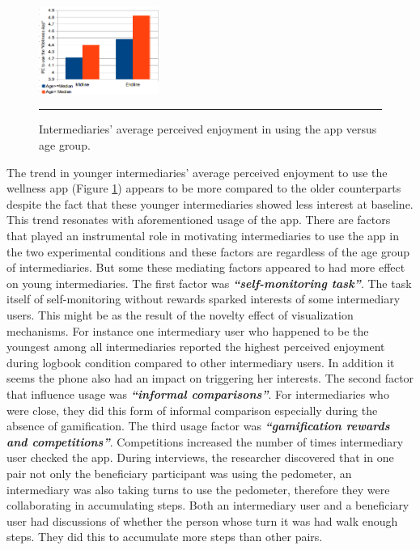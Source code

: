 \documentclass{sig-alternate}
\begin{document}
\begin{figure}[htbp]
  \centering
    \includegraphics[width=0.35\textwidth]{PE_Interm_App.png}
    \rule{26em}{0.5pt}
  \caption{Intermediaries' average perceived enjoyment in using the app versus age group.}
  \label{figure:PE_Interm_App}
\end{figure}
The trend in younger intermediaries' average perceived enjoyment to use the wellness app (Figure \ref{figure:PE_Interm_App})  appears to be more compared to the older counterparts despite the fact that these younger intermediaries showed less interest at baseline. This trend resonates with aforementioned usage of the app.\newline
There are factors that played an instrumental role in motivating intermediaries to use the app in the two experimental conditions and these factors are regardless of the age group of intermediaries. But some these mediating factors appeared to had more effect on young intermediaries. The first factor was
\emph{\textbf{``self-monitoring task''}}. The task itself of self-monitoring without rewards sparked interests of some intermediary users. This might be as the result of the novelty effect of visualization mechanisms. For instance one intermediary user who happened to be the youngest among all intermediaries reported the highest perceived enjoyment during logbook condition compared to other intermediary users. In addition it seems the phone also had an impact on triggering her interests.\newline
The second factor that influence usage was \emph{\textbf{``informal comparisons''}}. For intermediaries who were close, they did this form of informal comparison especially during the absence of gamification.\newline 
The third usage factor was \emph{\textbf{``gamification rewards and  competitions''}}. Competitions increased the number of times intermediary user checked the app. During interviews, the researcher discovered that in one pair not only the beneficiary participant was using the pedometer, an intermediary was also taking turns to use the pedometer, therefore they were collaborating in accumulating steps. Both an intermediary user and a beneficiary user had discussions of whether the person whose turn it was had walk enough steps. They did this to accumulate more steps than other pairs.\newline
\end{document}

